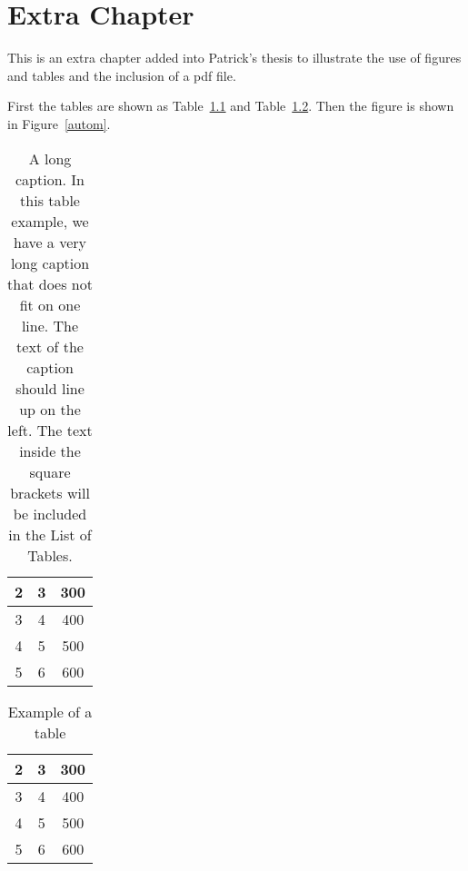 
\chapter{Extra Chapter}

This is an extra chapter added into Patrick's thesis to illustrate
the use of figures and tables and the inclusion of a pdf file.

First the tables are shown as Table~\ref{smalltable} and
Table~\ref{smalltable2}. Then the
figure is shown in Figure~\ref{autom}.

\begin{table}
\begin{center}
\caption[A long caption]{A long caption.
In this table example, we have a very
long caption that does not fit on one line. The text of the
caption should line up on the left. The text inside the square
brackets will be included in the List of Tables.}
\label{smalltable}
\vspace{0.2in}
\begin{tabular}{|c|c|c|}\hline
2 & 3 & 300 \\ \hline
3 & 4 & 400 \\ \hline
4 & 5 & 500 \\ \hline
5 & 6 & 600 \\ \hline
\end{tabular}
\end{center}
\end{table}

\begin{table}
\begin{center}
\caption{Example of a table}
\label{smalltable2}
\vspace{0.2in}
\begin{tabular}{|c|c|c|}\hline
2 & 3 & 300 \\ \hline
3 & 4 & 400 \\ \hline
4 & 5 & 500 \\ \hline
5 & 6 & 600 \\ \hline
\end{tabular}
\end{center}
\end{table}

